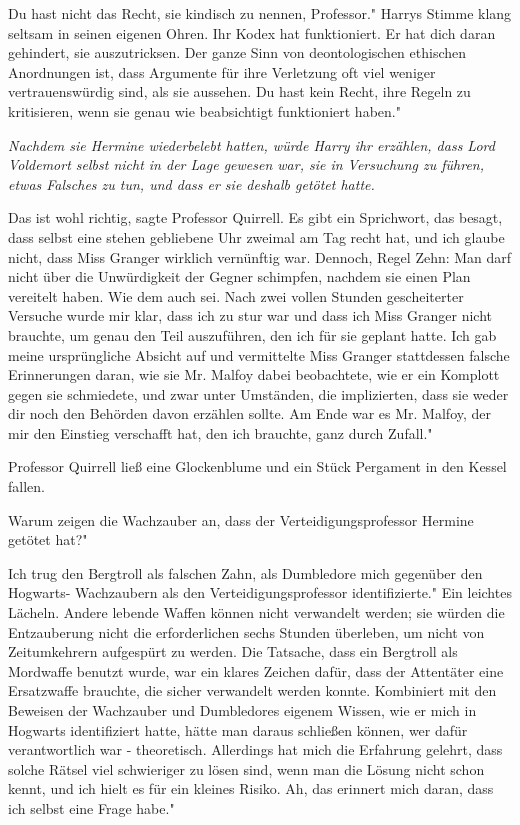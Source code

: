\glqq{}Du hast nicht das Recht, sie kindisch zu nennen, Professor." Harrys Stimme
klang seltsam in seinen eigenen Ohren. \glqq{}Ihr Kodex hat funktioniert. Er hat
dich daran gehindert, sie auszutricksen. Der ganze Sinn von deontologischen
ethischen Anordnungen ist, dass Argumente für ihre Verletzung oft viel weniger
vertrauenswürdig sind, als sie aussehen. Du hast kein Recht, ihre Regeln zu
kritisieren, wenn sie genau wie beabsichtigt funktioniert haben."

\emph{Nachdem sie Hermine wiederbelebt hatten, würde Harry ihr erzählen, dass
Lord Voldemort selbst nicht in der Lage gewesen war, sie in Versuchung zu
führen, etwas Falsches zu tun, und dass er sie deshalb getötet hatte.}

\glqq{}Das ist wohl richtig\grqq{}, sagte Professor Quirrell. \glqq{}Es gibt ein
Sprichwort, das besagt, dass selbst eine stehen gebliebene Uhr zweimal am Tag
recht hat, und ich glaube nicht, dass Miss Granger wirklich vernünftig war.
Dennoch, Regel Zehn: Man darf nicht über die Unwürdigkeit der Gegner schimpfen,
nachdem sie einen Plan vereitelt haben. Wie dem auch sei. Nach zwei vollen
Stunden gescheiterter Versuche wurde mir klar, dass ich zu stur war und dass ich
Miss Granger nicht brauchte, um genau den Teil auszuführen, den ich für sie
geplant hatte. Ich gab meine ursprüngliche Absicht auf und vermittelte Miss
Granger stattdessen falsche Erinnerungen daran, wie sie Mr. Malfoy dabei
beobachtete, wie er ein Komplott gegen sie schmiedete, und zwar unter Umständen,
die implizierten, dass sie weder dir noch den Behörden davon erzählen sollte. Am
Ende war es Mr. Malfoy, der mir den Einstieg verschafft hat, den ich brauchte,
ganz durch Zufall."

Professor Quirrell ließ eine Glockenblume und ein Stück Pergament in den Kessel
fallen.

\glqq{}Warum zeigen die Wachzauber an, dass der Verteidigungsprofessor Hermine
getötet hat?"

\glqq{}Ich trug den Bergtroll als falschen Zahn, als Dumbledore mich gegenüber
den Hogwarts- Wachzaubern als den Verteidigungsprofessor identifizierte." Ein
leichtes Lächeln. \glqq{}Andere lebende Waffen können nicht verwandelt werden;
sie würden die Entzauberung nicht die erforderlichen sechs Stunden überleben, um
nicht von Zeitumkehrern aufgespürt zu werden. Die Tatsache, dass ein Bergtroll
als Mordwaffe benutzt wurde, war ein klares Zeichen dafür, dass der Attentäter
eine Ersatzwaffe brauchte, die sicher verwandelt werden konnte. Kombiniert mit
den Beweisen der Wachzauber und Dumbledores eigenem Wissen, wie er mich in
Hogwarts identifiziert hatte, hätte man daraus schließen können, wer dafür
verantwortlich war - theoretisch. Allerdings hat mich die Erfahrung gelehrt,
dass solche Rätsel viel schwieriger zu lösen sind, wenn man die Lösung nicht
schon kennt, und ich hielt es für ein kleines Risiko. Ah, das erinnert mich
daran, dass ich selbst eine Frage habe."

